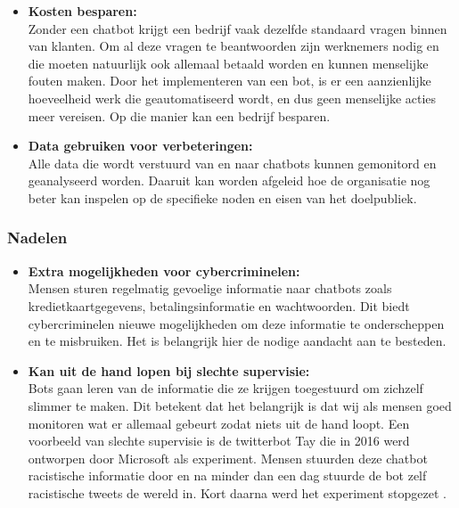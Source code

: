 \begin{itemize}
    \item \textbf{Kosten besparen:} \\
    
    Zonder een chatbot krijgt een bedrijf vaak dezelfde standaard vragen binnen van klanten. Om al deze vragen te beantwoorden zijn werknemers nodig en die moeten natuurlijk ook allemaal betaald worden en kunnen menselijke fouten maken. Door het implementeren van een bot, is er een aanzienlijke hoeveelheid werk die geautomatiseerd wordt, en dus geen menselijke acties meer vereisen. Op die manier kan een bedrijf besparen. \\
    
    \item \textbf{Data gebruiken voor verbeteringen:} \\
    
    Alle data die wordt verstuurd van en naar chatbots kunnen gemonitord en geanalyseerd worden. Daaruit kan worden afgeleid hoe de organisatie nog beter kan inspelen op de specifieke noden en eisen van het doelpubliek. \\ 
    
\end{itemize}

\subsubsection{Nadelen}
\label{subsubsec:chatbots-voor-en-nadelen-nadelen}

\begin{itemize}
    \item \textbf{Extra mogelijkheden voor cybercriminelen:} \\
    
    Mensen sturen regelmatig gevoelige informatie naar chatbots zoals kredietkaartgegevens, betalingsinformatie en wachtwoorden. Dit biedt cybercriminelen nieuwe mogelijkheden om deze informatie te onderscheppen en te misbruiken. Het is belangrijk hier de nodige aandacht aan te besteden. \\
    
    \item \textbf{Kan uit de hand lopen bij slechte supervisie:} \\
    
    Bots gaan leren van de informatie die ze krijgen toegestuurd om zichzelf slimmer te maken. Dit betekent dat het belangrijk is dat wij als mensen goed monitoren wat er allemaal gebeurt zodat niets uit de hand loopt. Een voorbeeld van slechte supervisie is de twitterbot Tay die in 2016 werd ontworpen door Microsoft als experiment. Mensen stuurden deze chatbot racistische informatie door en na minder dan een dag stuurde de bot zelf racistische tweets de wereld in. Kort daarna werd het experiment stopgezet \autocite{Vincent2016}. \\
    
\end{itemize}

